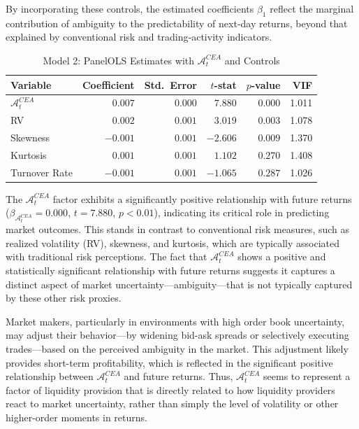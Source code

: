 \documentclass[preprint,12pt,authoryear]{elsarticle}
\begin{document}
By incorporating these controls, the estimated coefficients \(\beta_1\) reflect the marginal contribution of ambiguity to the predictability of next‐day returns, beyond that explained by conventional risk and trading‐activity indicators.

\begin{table}[h!]
  \centering
\caption{Model 2: PanelOLS Estimates with \(\mathcal{A}^{CEA}_t\) and Controls}
  \label{tab:panelols_model2}
  \begin{tabularx}{\textwidth}{Xrrrrr}
    \toprule
    Variable         & Coefficient & Std.\ Error & \(t\)-stat & \(p\)-value & VIF    \\
    \midrule
    \(\mathcal{A}^{CEA}_t\) & \(0.007\)   & \(0.000\)   & \(7.880\)   & \(0.000\)   & 1.011  \\
    RV               & \(0.002\)   & \(0.001\)   & \(3.019\)   & \(0.003\)   & 1.078  \\
    Skewness         & \(-0.001\)  & \(0.001\)   & \(-2.606\)  & \(0.009\)   & 1.370  \\
    Kurtosis         & \(0.001\)   & \(0.001\)   & \(1.102\)   & \(0.270\)   & 1.408  \\
    Turnover Rate    & \(-0.001\)  & \(0.001\)   & \(-1.065\)  & \(0.287\)   & 1.026  \\
    \bottomrule
  \end{tabularx}
\end{table}

The $\mathcal{A}^{CEA}_t$ factor exhibits a significantly positive relationship with future returns (\(\beta_{\mathcal{A}^{CEA}_t} = 0.000\), \(t = 7.880\), \(p < 0.01\)), indicating its critical role in predicting market outcomes. This stands in contrast to conventional risk measures, such as realized volatility (RV), skewness, and kurtosis, which are typically associated with traditional risk perceptions. The fact that $\mathcal{A}^{CEA}_t$ shows a positive and statistically significant relationship with future returns suggests it captures a distinct aspect of market uncertainty—ambiguity—that is not typically captured by these other risk proxies.

Market makers, particularly in environments with high order book uncertainty, may adjust their behavior—by widening bid-ask spreads or selectively executing trades—based on the perceived ambiguity in the market. This adjustment likely provides short-term profitability, which is reflected in the significant positive relationship between $\mathcal{A}^{CEA}_t$ and future returns. Thus, $\mathcal{A}^{CEA}_t$ seems to represent a factor of liquidity provision that is directly related to how liquidity providers react to market uncertainty, rather than simply the level of volatility or other higher-order moments in returns.
\end{document}
